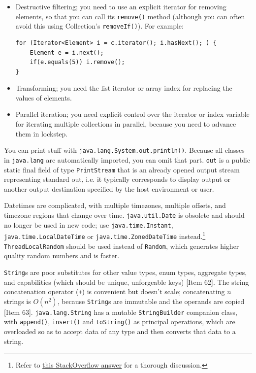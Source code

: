 \documentclass[table, xcdraw]{article}%
\begin{document}
\begin{itemize}
    \item Destructive filtering; you need to use an explicit iterator for removing elements, so that you can call its \texttt{remove()} method (although you can often avoid this using Collection’s \texttt{removeIf()}). For example:

    \begin{verbatim}
for (Iterator<Element> i = c.iterator(); i.hasNext(); ) {
    Element e = i.next();
    if(e.equals(5)) i.remove();
}
    \end{verbatim}
    \item Transforming; you need the list iterator or array index for replacing the values of elements.
    \item Parallel iteration; you need explicit control over the iterator or index variable for iterating multiple collections in parallel, because you need to advance them in lockstep.
\end{itemize}

You can print stuff with \texttt{java.lang.System.out.println()}. Because all classes in \texttt{java.lang} are automatically imported, you can omit that part. \texttt{out} is a public static final field of type \texttt{PrintStream} that is an already opened output stream representing standard out, i.e. it typically corresponds to display output or another output destination specified by the host environment or user.

Datetimes are complicated, with multiple timezones, multiple offsets, and timezone regions that change over time. \texttt{java.util.Date} is obsolete and should no longer be used in new code; use \texttt{java.time.Instant}, \texttt{java.time.LocalDateTime} or \texttt{java.time.ZonedDateTime} instead.\footnote{Refer to \href{https://stackoverflow.com/a/56508200}{this StackOverflow answer} for a thorough discussion.} \texttt{ThreadLocalRandom} should be used instead of \texttt{Random}, which generates higher quality random numbers and is faster.

\texttt{String}s are poor substitutes for other value types, enum types, aggregate types, and capabilities (which should be unique, unforgeable keys) [Item 62]. The string concatenation operator (\texttt{+}) is convenient but doesn't scale; concatenating $n$ strings is $O(n^2)$, because \texttt{String}s are immutable and the operands are copied [Item 63]. \texttt{java.lang.String} has a mutable \texttt{StringBuilder} companion class, with \texttt{append()}, \texttt{insert()} and \texttt{toString()} as principal operations, which are overloaded so as to accept data of any type and then converts that data to a string.
\end{document}
